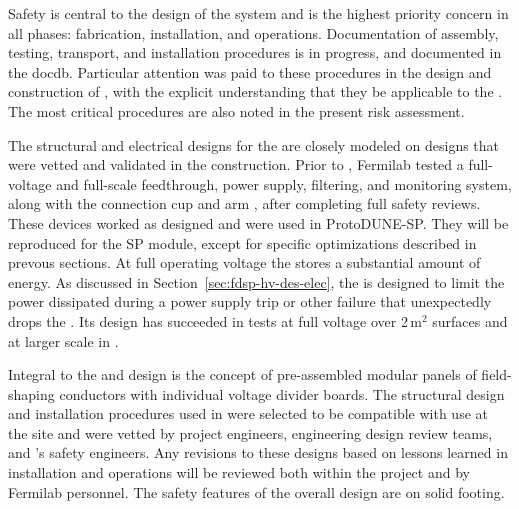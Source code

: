 Safety is central to the design of the  system and is the highest priority concern in all phases: fabrication, installation, and operations. Documentation of assembly, testing, transport, and installation procedures is in progress, and documented in the docdb. Particular attention was paid to these procedures in the design and construction of , with the explicit understanding that they be applicable to the . The most critical procedures are also noted in the present  risk assessment. 

The structural and electrical designs for the   are closely modeled on designs that were vetted and validated in the  construction. 
Prior to , Fermilab tested a full-voltage and full-scale  feedthrough, power supply, filtering, and monitoring system, along with the  connection cup and arm  %
, after completing full safety reviews. 
These devices worked as designed and were used in ProtoDUNE-SP. They will be reproduced for the SP module,  except for specific optimizations described in prevous sections.
At full operating voltage the  stores a substantial amount of energy.
As discussed in Section~\ref{sec:fdsp-hv-des-elec}, the  is designed to limit the power dissipated during a power supply trip or other failure that unexpectedly drops the .
Its design has succeeded in tests at full voltage over \num{2}\,m$^2$ surfaces and at larger scale in .  

Integral to the  and  design is the concept of pre-assembled modular panels of field-shaping conductors with individual voltage divider boards. The structural design and installation procedures used in  were selected to be compatible with use at the  site and were vetted by project engineers, engineering design review teams, and 's safety engineers. Any revisions to these designs based on lessons learned in   installation and operations will be reviewed both within the project and by Fermilab  personnel. The safety features of the overall design are on solid footing. 



